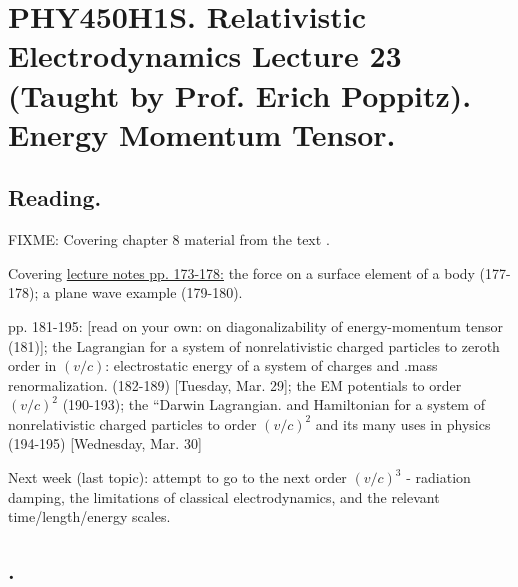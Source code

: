 
%

\chapter{PHY450H1S.  Relativistic Electrodynamics Lecture 23 (Taught by Prof. Erich Poppitz).  Energy Momentum Tensor.}
\label{chap:relativisticElectrodynamicsL23}
{}
\date{Mar 23, 2011}

\beginArtNoToc

\section{Reading.}

FIXME:
Covering chapter 8 material from the text \cite{landau1980classical}.

Covering \href{http://www.physics.utoronto.ca/~poppitz/epoppitz/PHY450_files/RelEMpp166-180.pdf}{lecture notes pp. 173-178:} the force on a surface element of a body (177-178); a plane wave example (179-180).

pp. 181-195: [read on your own: on diagonalizability of energy-momentum tensor (181)]; the Lagrangian for a system of nonrelativistic charged particles to zeroth order in $(v/c)$: electrostatic energy of a system of charges and .mass renormalization. (182-189) [Tuesday, Mar. 29]; the EM potentials to order $(v/c)^2$ (190-193); the ``Darwin Lagrangian.  and Hamiltonian for a system of nonrelativistic charged particles to order $(v/c)^2$ and its many uses in physics (194-195) [Wednesday, Mar. 30]

Next week (last topic): attempt to go to the next order $(v/c)^3$ - radiation damping, the limitations of classical electrodynamics, and the relevant time/length/energy scales.

\section{.}

\EndArticle
